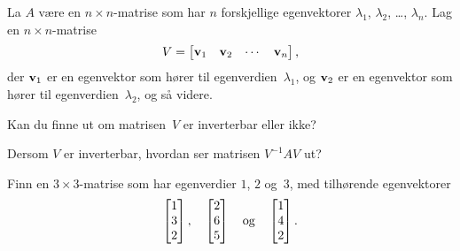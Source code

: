 \begin{oppgave}
La $A$ være en $n \times n$-matrise som har $n$ forskjellige
egenvektorer
$\lambda_1$, $\lambda_2$, \ldots, $\lambda_n$.
Lag en $n \times n$-matrise
\[
V = \begin{bmatrix} \mathbf{v}_1 & \mathbf{v}_2 & \cdots & \mathbf{v}_n \end{bmatrix},
\]
der $\mathbf{v}_1$ er en egenvektor som hører til egenverdien~$\lambda_1$,
og $\mathbf{v}_2$ er en egenvektor som hører til egenverdien~$\lambda_2$,
og så videre.
\begin{punkt}
Kan du finne ut om matrisen~$V$ er inverterbar eller ikke?
\end{punkt}
\begin{punkt}
Dersom $V$ er inverterbar, hvordan ser matrisen $V^{-1} A V$ ut?
\end{punkt}
\begin{punkt}
Finn en $3 \times 3$-matrise som har egenverdier $1$, $2$ og~$3$, med
tilhørende egenvektorer
\[
\begin{bmatrix} 1 \\ 3 \\ 2 \end{bmatrix},\quad
\begin{bmatrix} 2 \\ 6 \\ 5 \end{bmatrix}\quad\text{og}\quad
\begin{bmatrix} 1 \\ 4 \\ 2 \end{bmatrix}.
\]
\end{punkt}
\end{oppgave}

